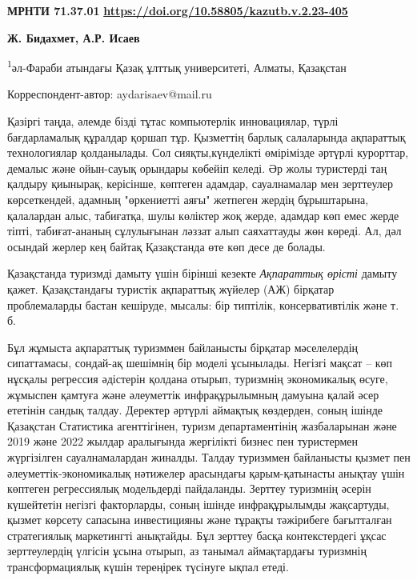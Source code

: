 \newpage
{}
{\bfseries МРНТИ 71.37.01}
\hfill {\bfseries \href{https://doi.org/10.58805/kazutb.v.2.23-405}{https://doi.org/10.58805/kazutb.v.2.23-405}}


\begin{center}
{\bfseries Ж. Бидахмет, А.Р. Исаев\envelope}

\textsuperscript{1}әл-Фараби атындағы Қазақ ұлттық университеті, Алматы,
Қазақстан

\envelope Корреспондент-автор: aydarisaev@mail.ru
\end{center}

Қазіргі таңда, әлемде бізді тұтас компьютерлік инновациялар, түрлі
бағдарламалық құралдар қоршап тұр. Қызметтің барлық салаларында
ақпараттық технологиялар қолданылады. Сол сияқты,күнделікті өмірімізде
әртүрлі курорттар, демалыс және ойын-сауық орындары көбейіп келеді. Әр
жолы туристерді таң қалдыру қиынырақ, керісінше, көптеген адамдар,
сауалнамалар мен зерттеулер көрсеткендей, адамның "өркениетті аяғы"
жетпеген жердің бұрыштарына, қалалардан алыс, табиғатқа, шулы көліктер
жоқ жерде, адамдар көп емес жерде тіпті, табиғат-ананың сұлулығынан
ләззат алып саяхаттауды жөн көреді. Ал, дәл осындай жерлер кең байтақ
Қазақстанда өте көп десе де болады.

Қазақстанда туризмді дамыту үшін бірінші кезекте \emph{Ақпараттық
өрісті} дамыту қажет. Қазақстандағы туристік ақпараттық жүйелер (АЖ)
бірқатар проблемаларды бастан кешіруде, мысалы: бір типтілік,
консервативтілік және т. б.

Бұл жұмыста ақпараттық туризммен байланысты бірқатар мәселелердің
сипаттамасы, сондай-ақ шешімнің бір моделі ұсынылады. Негізгі мақсат --
көп нұсқалы регрессия әдістерін қолдана отырып, туризмнің экономикалық
өсуге, жұмыспен қамтуға және әлеуметтік инфрақұрылымның дамуына қалай
әсер ететінін сандық талдау. Деректер әртүрлі аймақтық көздерден, соның
ішінде Қазақстан Статистика агенттігінен, туризм департаментінің
жазбаларынан және 2019 және 2022 жылдар аралығында жергілікті бизнес пен
туристермен жүргізілген сауалнамалардан жиналды. Талдау туризммен
байланысты қызмет пен әлеуметтік-экономикалық нәтижелер арасындағы
қарым-қатынасты анықтау үшін көптеген регрессиялық модельдерді
пайдаланды. Зерттеу туризмнің әсерін күшейтетін негізгі факторларды,
соның ішінде инфрақұрылымды жақсартуды, қызмет көрсету сапасына
инвестицияны және тұрақты тәжірибеге бағытталған стратегиялық
маркетингті анықтайды. Бұл зерттеу басқа контекстердегі ұқсас
зерттеулердің үлгісін ұсына отырып, аз танымал аймақтардағы туризмнің
трансформациялық күшін тереңірек түсінуге ықпал етеді.

